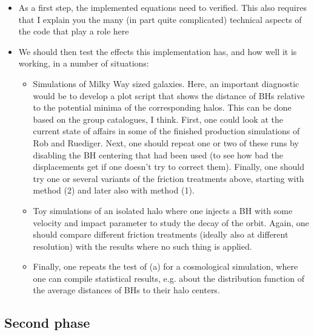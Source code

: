 \documentclass[a4,useAMS,usenatbib,usegraphicx,12pt]{article}
\begin{document}
\begin{itemize} 
 
\item  As a first step, the implemented equations need to verified. This also requires that I
explain you the many (in part quite complicated) technical aspects of the code that play a
role here
\item  We should then test the effects this implementation has, and how well it is working, in a
number of situations:

\begin{itemize}


\item Simulations of Milky Way sized galaxies. Here, an important diagnostic would be to
develop a plot script that shows the distance of BHs relative to the potential minima of
the
corresponding halos. This can be done based on the group catalogues, I think. First, one
could look at the current state of affairs in some of the finished production simulations of
Rob and Ruediger. Next, one should repeat one or two of these runs by disabling the BH
centering that had been used (to see how bad the displacements get if one doesn’t try to
correct them). Finally, one should try one or several variants of the friction treatments
above, starting with method (2) and later also with method (1).

\item Toy simulations of an isolated halo where one injects a BH with some velocity and
impact parameter to study the decay of the orbit. Again, one should compare different
friction treatments (ideally also at different resolution) with the results where no such thing
is applied.

\item Finally, one repeats the test of (a) for a cosmological simulation, where one can
compile statistical results, e.g. about the distribution function of the average distances of
BHs to their halo centers.

\end{itemize}

\end{itemize}

\subsection*{Second phase}
\end{document}
